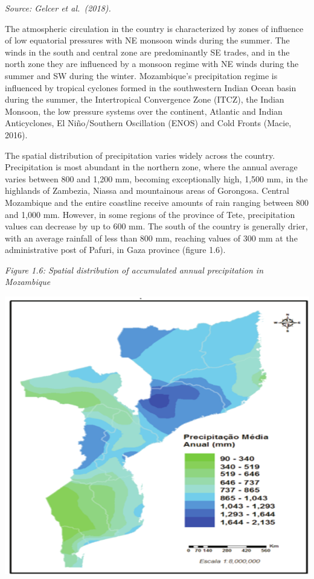 \documentclass[
]{book}
\begin{document}
\emph{Source: Gelcer et al.~(2018).}

The atmospheric circulation in the country is characterized by zones of influence of low equatorial pressures with NE monsoon winds during the summer. The winds in the south and central zone are predominantly SE trades, and in the north zone they are influenced by a monsoon regime with NE winds during the summer and SW during the winter. Mozambique's precipitation regime is influenced by tropical cyclones formed in the southwestern Indian Ocean basin during the summer, the Intertropical Convergence Zone (ITCZ), the Indian Monsoon, the low pressure systems over the continent, Atlantic and Indian Anticyclones, El Niño/Southern Oscillation (ENOS) and Cold Fronts (Macie, 2016).

The spatial distribution of precipitation varies widely across the country. Precipitation is most abundant in the northern zone, where the annual average varies between 800 and 1,200 mm, becoming exceptionally high, 1,500 mm, in the highlands of Zambezia, Niassa and mountainous areas of Gorongosa. Central Mozambique and the entire coastline receive amounts of rain ranging between 800 and 1,000 mm. However, in some regions of the province of Tete, precipitation values can decrease by up to 600 mm. The south of the country is generally drier, with an average rainfall of less than 800 mm, reaching values of 300 mm at the administrative post of Pafuri, in Gaza province (figure 1.6).

\emph{Figure 1.6: Spatial distribution of accumulated annual precipitation in Mozambique}

\includegraphics{Precipitation-distribution.png}
\end{document}
